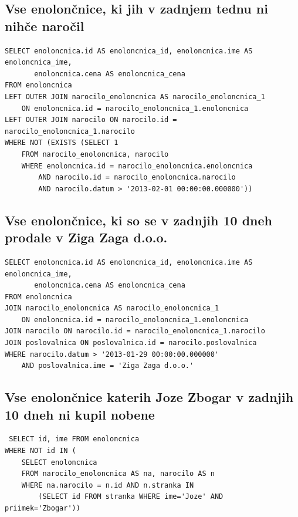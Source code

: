 \documentclass[12pt]{article}
\begin{document}
\subsection{Vse enolončnice, ki jih v zadnjem tednu ni nihče naročil}

\begin{verbatim}
SELECT enoloncnica.id AS enoloncnica_id, enoloncnica.ime AS enoloncnica_ime,
       enoloncnica.cena AS enoloncnica_cena 
FROM enoloncnica
LEFT OUTER JOIN narocilo_enoloncnica AS narocilo_enoloncnica_1
    ON enoloncnica.id = narocilo_enoloncnica_1.enoloncnica
LEFT OUTER JOIN narocilo ON narocilo.id = narocilo_enoloncnica_1.narocilo 
WHERE NOT (EXISTS (SELECT 1 
    FROM narocilo_enoloncnica, narocilo 
    WHERE enoloncnica.id = narocilo_enoloncnica.enoloncnica
        AND narocilo.id = narocilo_enoloncnica.narocilo
        AND narocilo.datum > '2013-02-01 00:00:00.000000'))
\end{verbatim}

\subsection{Vse enolončnice, ki so se v zadnjih 10 dneh prodale v Ziga Zaga d.o.o.}

\begin{verbatim}
SELECT enoloncnica.id AS enoloncnica_id, enoloncnica.ime AS enoloncnica_ime,
       enoloncnica.cena AS enoloncnica_cena 
FROM enoloncnica
JOIN narocilo_enoloncnica AS narocilo_enoloncnica_1
    ON enoloncnica.id = narocilo_enoloncnica_1.enoloncnica
JOIN narocilo ON narocilo.id = narocilo_enoloncnica_1.narocilo
JOIN poslovalnica ON poslovalnica.id = narocilo.poslovalnica 
WHERE narocilo.datum > '2013-01-29 00:00:00.000000'
    AND poslovalnica.ime = 'Ziga Zaga d.o.o.'
\end{verbatim}

\subsection{Vse enolončnice katerih Joze Zbogar v zadnjih 10 dneh ni kupil nobene}

\begin{verbatim}
 SELECT id, ime FROM enoloncnica
WHERE NOT id IN (
    SELECT enoloncnica
    FROM narocilo_enoloncnica AS na, narocilo AS n
    WHERE na.narocilo = n.id AND n.stranka IN
        (SELECT id FROM stranka WHERE ime='Joze' AND priimek='Zbogar'))
\end{verbatim}
    
\end{document}
